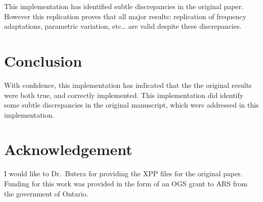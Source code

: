 \documentclass[10pt,a4paper,onecolumn]{article}
\begin{document}
This implementation has identified subtle discrepancies in the original
paper. However this replication proves that all major results:
replication of frequency adaptations, parametric variation, etc\ldots{}
are valid despite these discrepancies.

\section{Conclusion}\label{conclusion}

With confidence, this implementation has indicated that the the original
results were both true, and correctly implemented. This implementation
did identify some subtle discrepancies in the original manuscript, which
were addressed in this implementation.

\section{Acknowledgement}\label{acknowledgement}

I would like to Dr.~Butera for providing the XPP files for the original
paper. Funding for this work was provided in the form of an OGS grant to
ARS from the government of Ontario.

{\sffamily \small
  \printbibliography[title=References]
}
\end{document}

